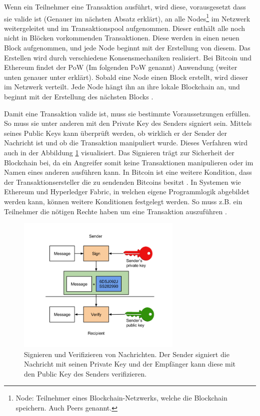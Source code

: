Wenn ein Teilnehmer eine Transaktion ausführt, wird diese, vorausgesetzt dass sie valide ist (Genauer im nächsten Absatz erklärt), an alle Nodes\footnote{Node: Teilnehmer eines Blockchain-Netzwerks, welche die Blockchain speichern. Auch Peers genannt.} im Netzwerk weitergeleitet und im Transaktionspool aufgenommen. Dieser enthält alle noch nicht in Blöcken vorkommenden Transaktionen. Diese werden in einen neuen Block aufgenommen, und jede Node beginnt mit der Erstellung von diesem. Das Erstellen wird durch verschiedene Konsensmechaniken realisiert. Bei Bitcoin und Ethereum findet der PoW (Im folgenden PoW genannt) Anwendung (weiter unten genauer unter erklärt). Sobald eine Node einen Block erstellt, wird dieser im Netzwerk verteilt. Jede Node hängt ihn an ihre lokale Blockchain an, und beginnt mit der Erstellung des nächsten Blocks \cite{AntonopoulosMasteringbitcoin2015}.

Damit eine Transaktion valide ist, muss sie bestimmte Voraussetzungen erfüllen. So muss sie unter anderen mit den Private Key des Senders signiert sein. Mittels seines Public Keys kann überprüft werden, ob wirklich er der Sender der Nachricht ist und ob die Transaktion manipuliert wurde. Dieses Verfahren wird auch in der Abbildung \ref{fig:key-signing} visualisiert. Das Signieren trägt zur Sicherheit der Blockchain bei, da ein Angreifer somit keine Transaktionen manipulieren oder im Namen eines anderen ausführen kann. In Bitcoin ist eine weitere Kondition, dass der Transaktionsersteller die zu sendenden Bitcoins besitzt \cite{AntonopoulosMasteringbitcoin2015}. In Systemen wie Ethereum und Hyperledger Fabric, in welchen eigene Programmlogik abgebildet werden kann, können weitere Konditionen festgelegt werden. So muss z.B. ein Teilnehmer die nötigen Rechte haben um eine Transaktion auszuführen \cite{HyperledgerComposerTeamAccessControlLanguage}.

\begin{figure}[htb]
	\centering
	  \includegraphics[width=0.7\textwidth,angle=0]{images/key-signing}
	  \caption{Signieren und Verifizieren von Nachrichten. Der Sender signiert die Nachricht mit seinen Private Key und der Empfänger kann diese mit den Public Key des Senders verifizieren.}
	  \label{fig:key-signing}
\end{figure}
	

